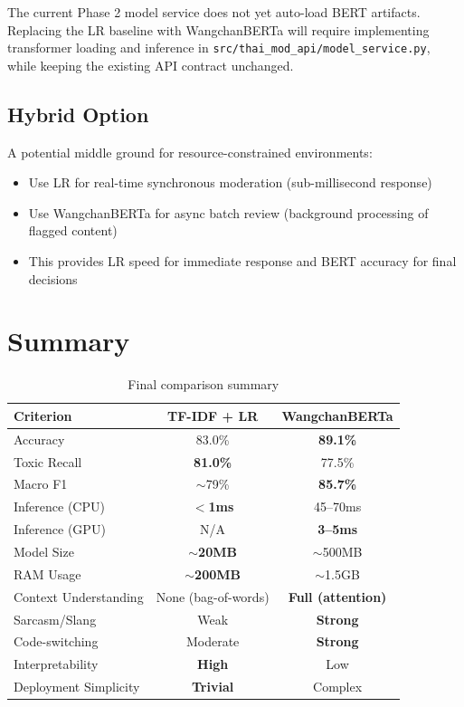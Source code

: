 \documentclass[11pt,a4paper]{article}
\begin{document}
The current Phase 2 model service does not yet auto-load BERT artifacts.
Replacing the LR baseline with WangchanBERTa will require implementing
transformer loading and inference in \texttt{src/thai\_mod\_api/model\_service.py},
while keeping the existing API contract unchanged.

\subsection{Hybrid Option}

A potential middle ground for resource-constrained environments:
\begin{itemize}[nosep]
    \item Use LR for real-time synchronous moderation (sub-millisecond response)
    \item Use WangchanBERTa for async batch review (background processing of flagged content)
    \item This provides LR speed for immediate response and BERT accuracy for final decisions
\end{itemize}

\section{Summary}

\begin{table}[H]
\centering
\caption{Final comparison summary}
\label{tab:summary}
\begin{tabular}{@{}p{4cm}cc@{}}
\toprule
\textbf{Criterion} & \textbf{TF-IDF + LR} & \textbf{WangchanBERTa} \\
\midrule
Accuracy               & 83.0\% & \textbf{89.1\%} \\
Toxic Recall           & \textbf{81.0\%} & 77.5\% \\
Macro F1               & $\sim$79\% & \textbf{85.7\%} \\
Inference (CPU)        & \textbf{$<$1ms} & 45--70ms \\
Inference (GPU)        & N/A & \textbf{3--5ms} \\
Model Size             & \textbf{$\sim$20MB} & $\sim$500MB \\
RAM Usage              & \textbf{$\sim$200MB} & $\sim$1.5GB \\
Context Understanding  & None (bag-of-words) & \textbf{Full (attention)} \\
Sarcasm/Slang          & Weak & \textbf{Strong} \\
Code-switching         & Moderate & \textbf{Strong} \\
Interpretability       & \textbf{High} & Low \\
Deployment Simplicity  & \textbf{Trivial} & Complex \\
\bottomrule
\end{tabular}
\end{table}
\end{document}
